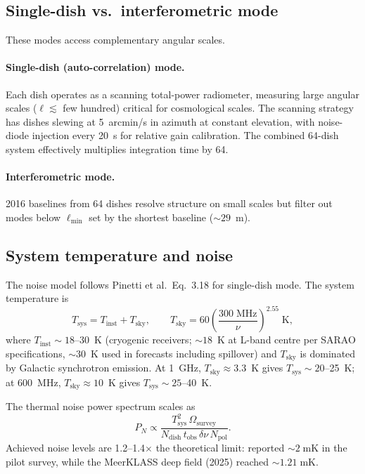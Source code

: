 \documentclass[10pt,a4paper]{article}
\newcommand{\Tsys}{T_{\mathrm{sys}}}
\newcommand{\Tinst}{T_{\mathrm{inst}}}
\newcommand{\Tsky}{T_{\mathrm{sky}}}
\begin{document}
\subsection{Single-dish vs.\ interferometric mode}

These modes access complementary angular scales.

\paragraph{Single-dish (auto-correlation) mode.}
Each dish operates as a scanning total-power radiometer, measuring large
angular scales ($\ell \lesssim$ few hundred) critical for cosmological scales.
The scanning strategy has dishes slewing at 5~arcmin/s in azimuth at constant
elevation, with noise-diode injection every 20~s for relative gain calibration.
The combined 64-dish system effectively multiplies integration time by 64.

\paragraph{Interferometric mode.}
2016 baselines from 64 dishes resolve structure on small scales but filter
out modes below $\ell_{\min}$ set by the shortest baseline ($\sim\!29$~m).


\subsection{System temperature and noise}

The noise model follows Pinetti et al.\ Eq.~3.18 for single-dish mode.  The
system temperature is
\begin{equation}
  \label{eq:Tsys}
  \Tsys = \Tinst + \Tsky, \qquad
  \Tsky = 60\left(\frac{300\;\mathrm{MHz}}{\nu}\right)^{2.55}\;\mathrm{K},
\end{equation}
where $\Tinst \sim 18$--30~K (cryogenic receivers; $\sim\!18$~K at L-band
centre per SARAO specifications, $\sim\!30$~K used in forecasts including
spillover) and $\Tsky$ is dominated by Galactic synchrotron emission.
At 1~GHz, $\Tsky \approx 3.3$~K gives $\Tsys \sim 20$--25~K; at 600~MHz,
$\Tsky \approx 10$~K gives $\Tsys \sim 25$--40~K.

The thermal noise power spectrum scales as
\begin{equation}
  P_N \propto \frac{\Tsys^{2}\,\Omega_{\mathrm{survey}}}
  {N_{\mathrm{dish}}\,t_{\mathrm{obs}}\,\delta\nu\,N_{\mathrm{pol}}}.
\end{equation}
Achieved noise levels are 1.2--1.4$\times$ the theoretical limit:
\citet{Wang2021} reported $\sim\!2\;\mathrm{mK}$ in the pilot survey, while
the MeerKLASS deep field (2025) reached $\sim\!1.21\;\mathrm{mK}$.
\end{document}
